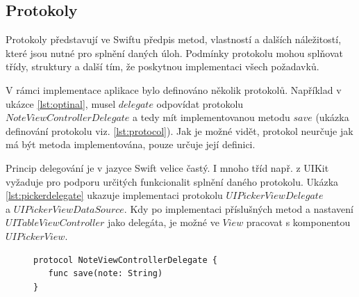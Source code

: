 \documentclass[thesis=M,czech]{FITthesis}[2012/06/26]
\begin{document}
\subsection{Protokoly}
Protokoly představují ve Swiftu předpis metod, vlastností a dalších náležitostí, které jsou nutné pro splnění daných úloh. Podmínky protokolu mohou splňovat třídy, struktury a další tím, že poskytnou implementaci všech požadavků. \cite{devProtocol}

V rámci implementace aplikace bylo definováno několik protokolů. Například v ukázce \ref{lst:optinal}, musel $delegate$ odpovídat protokolu\\ $NoteViewControllerDelegate$ a tedy mít implementovanou metodu $save$ (ukázka definování protokolu viz. \ref{lst:protocol}). Jak je možné vidět, protokol neurčuje jak má být metoda implementována, pouze určuje její definici.

Princip delegování je v jazyce Swift velice častý. I mnoho tříd např. z UIKit vyžaduje pro podporu určitých funkcionalit splnění daného protokolu. Ukázka \ref{lst:pickerdelegate} ukazuje implementaci protokolu $UIPickerViewDelegate$\\ a $UIPickerViewDataSource$. Kdy po implementaci příslušných metod a nastavení $UITableViewController$ jako delegáta, je možné ve $View$ pracovat s komponentou $UIPickerView$.
	
\begin{figure}
\begin{minipage}{\linewidth}
\begin{lstlisting}[caption={Definice protokolu},label={lst:protocol}]
protocol NoteViewControllerDelegate {
   func save(note: String)
}
\end{lstlisting}
\end{minipage}
\end{figure}	
\end{document}
